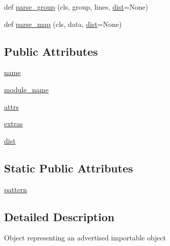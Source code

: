 \begin{DoxyCompactItemize}
\item 
def \hyperlink{classpip_1_1__vendor_1_1pkg__resources_1_1EntryPoint_a7a073b57c2523016366e96901108b1e3}{parse\+\_\+group} (cls, group, lines, \hyperlink{classpip_1_1__vendor_1_1pkg__resources_1_1EntryPoint_a49299c8f3500aa7c597471c965178590}{dist}=None)
\item 
def \hyperlink{classpip_1_1__vendor_1_1pkg__resources_1_1EntryPoint_a49afd2196172292b203587c86ced6b78}{parse\+\_\+map} (cls, data, \hyperlink{classpip_1_1__vendor_1_1pkg__resources_1_1EntryPoint_a49299c8f3500aa7c597471c965178590}{dist}=None)
\end{DoxyCompactItemize}
\subsection*{Public Attributes}
\begin{DoxyCompactItemize}
\item 
\hyperlink{classpip_1_1__vendor_1_1pkg__resources_1_1EntryPoint_a635d07dcee44f4fb1744e670dda216a4}{name}
\item 
\hyperlink{classpip_1_1__vendor_1_1pkg__resources_1_1EntryPoint_aa1b5517c4e2866708e4af59575878e4e}{module\+\_\+name}
\item 
\hyperlink{classpip_1_1__vendor_1_1pkg__resources_1_1EntryPoint_af9121f2b44ec692cb70a89047b125e74}{attrs}
\item 
\hyperlink{classpip_1_1__vendor_1_1pkg__resources_1_1EntryPoint_a7d6f7deb16e02871f135b59b146ef522}{extras}
\item 
\hyperlink{classpip_1_1__vendor_1_1pkg__resources_1_1EntryPoint_a49299c8f3500aa7c597471c965178590}{dist}
\end{DoxyCompactItemize}
\subsection*{Static Public Attributes}
\begin{DoxyCompactItemize}
\item 
\hyperlink{classpip_1_1__vendor_1_1pkg__resources_1_1EntryPoint_a79ee7c4dc4420601d5b5bce89ddac559}{pattern}
\end{DoxyCompactItemize}


\subsection{Detailed Description}
\begin{DoxyVerb}Object representing an advertised importable object\end{DoxyVerb}
 

